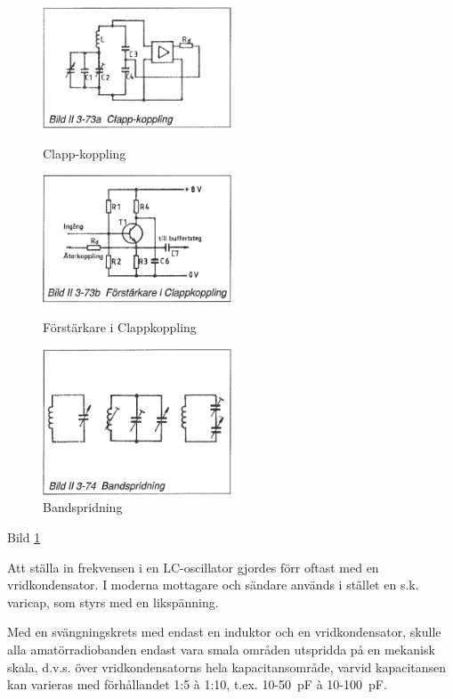 \begin{figure}
  \includegraphics[width=0.5\textwidth]{images/bild_2_3-73a}
  \caption{Clapp-koppling}
  \label{fig:BildII3-73a}

  \includegraphics[width=0.5\textwidth]{images/bild_2_3-73b}
  \caption{Förstärkare i Clappkoppling}
  \label{fig:BildII3-73b}

  \includegraphics[width=0.5\textwidth]{images/bild_2_3-74}
  \caption{Bandspridning}
  \label{fig:BildII3-74}
\end{figure}

Bild \ref{fig:BildII3-74}

Att ställa in frekvensen i en LC-oscillator gjordes förr oftast med en
vridkondensator. I moderna mottagare och sändare används i stället en
s.k. varicap, som styrs med en likspänning.

Med en svängningskrets med endast en induktor och en vridkondensator,
skulle alla amatörradiobanden endast vara smala områden utspridda på
en mekanisk skala, d.v.s.  över vridkondensatorns hela
kapacitansområde, varvid kapacitansen kan varieras med förhållandet
1:5 à 1:10, t.ex. 10-50~pF à 10-100~pF.

